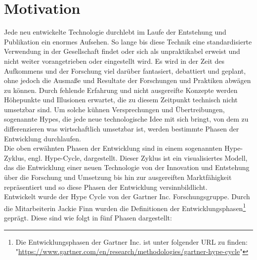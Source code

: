 \section{Motivation}
\label{sec:Motivation}
    Jede neu entwickelte Technologie durchlebt im Laufe der Entstehung und Publikation ein enormes Aufsehen. 
    So lange bis diese Technik eine standardisierte Verwendung in der Gesellschaft findet oder sich als 
    unpraktikabel erweist und nicht weiter vorangetrieben oder eingestellt wird. Es wird in der Zeit des 
    Aufkommens und der Forschung viel darüber fantasiert, debattiert und geplant, ohne jedoch die Ausmaße und 
    Resultate der Forschungen und Praktiken abwägen zu können. Durch fehlende Erfahrung und nicht ausgereifte 
    Konzepte werden Höhepunkte und Illusionen erwartet, die zu diesem Zeitpunkt technisch nicht umsetzbar sind. 
    Um solche kühnen Versprechungen und Übertreibungen, sogenannte Hypes, die jede neue technologische Idee 
    mit sich bringt, von dem zu differenzieren was wirtschaftlich umsetzbar ist, werden bestimmte Phasen 
    der Entwicklung durchlaufen. \cite{gartner.2022m}
    \\
    \linebreak
    Die oben erwähnten Phasen der Entwicklung sind in einem sogenannten Hype-Zyklus, engl. Hype-Cycle, dargestellt. 
    Dieser Zyklus ist ein visualisiertes Modell, das die Entwicklung einer neuen Technologie von der Innovation 
    und Entstehung über die Forschung und Umsetzung bis hin zur ausgereiften Marktfähigkeit repräsentiert und so 
    diese Phasen der Entwicklung versinnbildlicht.  
    \\
    Entwickelt wurde der Hype Cycle von der Gartner Inc. Forschungsgruppe. Durch die Mitarbeiterin 
    Jackie Finn wurden die Definitionen der Entwicklungsphasen\footnote{Die Entwicklungsphasen der Gartner Inc. ist unter folgender URL zu finden: "\url{https://www.gartner.com/en/research/methodologies/gartner-hype-cycle}"} 
    geprägt. Diese sind wie folgt in fünf Phasen 
    dargestellt:

